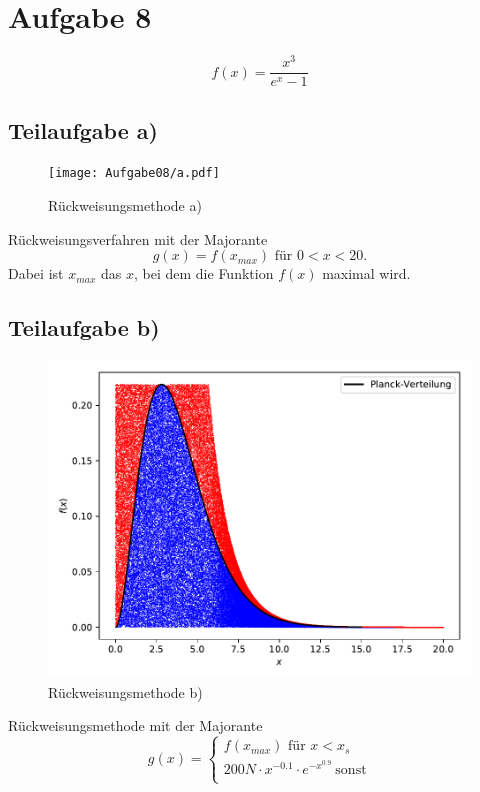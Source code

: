 \section{Aufgabe 8}
\begin{equation}
  f(x)=\frac{x^3}{e^x-1}
\end{equation}
\subsection{Teilaufgabe a)} \label{sec:8a}
\begin{figure}[H]
  \centering
  \texttt{[image: Aufgabe08/a.pdf]}
  \caption{Rückweisungsmethode a)}
  \label{fig:rwm1}
\end{figure}
Rückweisungsverfahren mit der Majorante
\begin{equation}
  g(x)=f(x_{max}) \text{ für } 0 < x < 20 \text{.}
\end{equation}
Dabei ist $x_{max}$ das $x$, bei dem die Funktion $f(x)$ maximal wird.
\subsection{Teilaufgabe b)} \label{sec:8b}
\begin{figure}[H]
  \centering
  \includegraphics{Aufgabe08/b.pdf}
  \caption{Rückweisungsmethode b)}
  \label{fig:rwm2}
\end{figure}

Rückweisungsmethode mit der Majorante
\begin{equation}
  g(x)=
  \begin{cases}
    f(x_{max}) \text{ für }  x < x_s \\
    200N \cdot x^{-0.1} \cdot e^{-x^{0.9}} \: \text{sonst}\\
\end{cases}
\end{equation}

